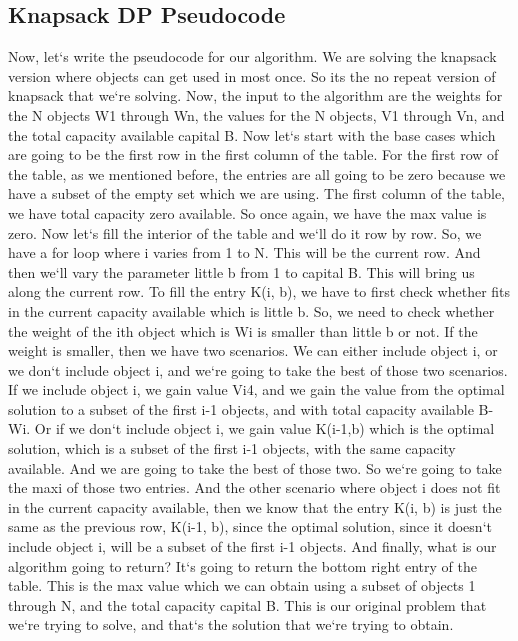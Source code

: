 \subsection{Knapsack  DP Pseudocode}
Now, let`s write the pseudocode for our algorithm.
We are solving the knapsack version where objects can get used in most once.
So its the no repeat version of knapsack that we`re solving.
Now, the input to the algorithm are the weights for the N objects W1 through Wn, the values for the N objects, V1 through Vn, and the total capacity available capital B\@.
Now let`s start with the base cases which are going to be the first row in the first column of the table.
For the first row of the table, as we mentioned before, the entries are all going to be zero because we have a subset of the empty set which we are using.
The first column of the table, we have total capacity zero available.
So once again, we have the max value is zero.
Now let`s fill the interior of the table and we`ll do it row by row.
So, we have a for loop where i varies from 1 to N\@.
This will be the current row.
And then we`ll vary the parameter little b from 1 to capital B\@.
This will bring us along the current row.
To fill the entry K(i, b), we have to first check whether fits in the current capacity available which is little b.
So, we need to check whether the weight of the ith object which is Wi is smaller than little b or not.
If the weight is smaller, then we have two scenarios.
We can either include object i, or we don`t include object i, and we`re going to take the best of those two scenarios.
If we include object i, we gain value Vi4, and we gain the value from the optimal solution to a subset of the first i-1 objects, and with total capacity available B-Wi.
Or if we don`t include object i, we gain value K(i-1,b) which is the optimal solution, which is a subset of the first i-1 objects, with the same capacity available.
And we are going to take the best of those two.
So we`re going to take the maxi of those two entries.
And the other scenario where object i does not fit in the current capacity available, then we know that the entry K(i, b) is just the same as the previous row, K(i-1, b), since the optimal solution, since it doesn`t include object i, will be a subset of the first i-1 objects.
And finally, what is our algorithm going to return? It`s going to return the bottom right entry of the table.
This is the max value which we can obtain using a subset of objects 1 through N, and the total capacity capital B\@.
This is our original problem that we`re trying to solve, and that`s the solution that we`re trying to obtain.

